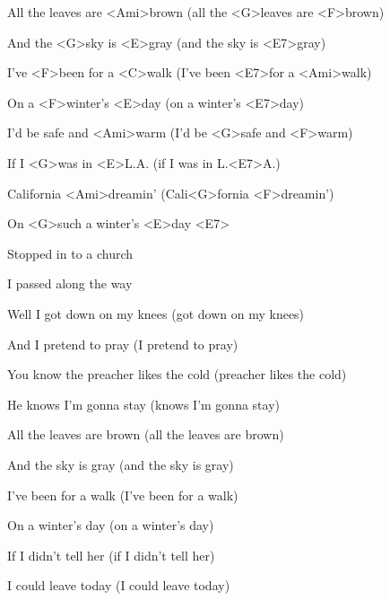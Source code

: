 
\zs
All {the} leaves are <Ami>brown (all the <G>leaves are <F>brown)

And the <G>sky is <E>gray (and the sky is <E7>gray)

I've <F>been for a <C>walk (I've been <E7>for a <Ami>walk)

On a <F>winter's <E>day (on a winter's <E7>day)

I'd {be} safe and <Ami>warm (I'd be <G>safe and <F>warm)

If I <G>was in <E>L.A. (if I was in L.<E7>A.)

\ks

\zr
Cali{fornia} <Ami>dreamin' (Cali<G>fornia <F>dreamin')

On <G>such a winter's <E>day <E7>
\kr

\zs
Stopped in to a church

I passed along the way

Well I got down on my knees (got down on my knees)

And I pretend to pray (I pretend to pray)

You know the preacher likes the cold (preacher likes the cold)

He knows I'm gonna stay (knows I'm gonna stay)

\ks
\zr

\kr
\zs

All the leaves are brown (all the leaves are brown)

And the sky is gray (and the sky is gray)

I've been for a walk (I've been for a walk)

On a winter's day (on a winter's day)

If I didn't tell her (if I didn't tell her)

I could leave today (I could leave today)

\ks

\zr
\kr

\zr
\kr
\kp


